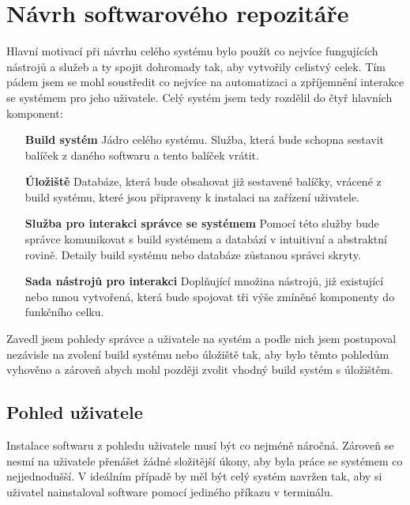 \documentclass[
  digital,     %
  oneside,     %
  nosansbold,  %
  nocolorbold, %
  lof,         %
  lot,         %
]{fithesis4}
\begin{document}
\chapter{Návrh softwarového repozitáře}

Hlavní motivací při návrhu celého systému bylo použít co nejvíce fungujících
nástrojů a služeb a ty spojit dohromady tak, aby vytvořily celistvý celek. Tím pádem
jsem se mohl soustředit co nejvíce na automatizaci a zpříjemnění interakce se systémem
pro jeho uživatele. Celý systém jsem tedy rozdělil do čtyř hlavních komponent:

\begin{itemize}
    \item[\textbf{Build systém}] Jádro celého systému. Služba, která bude 
    schopna sestavit balíček z daného softwaru a tento balíček vrátit.
    \item[\textbf{Úložiště}] Databáze, která bude obsahovat již sestavené balíčky,
    vrácené z build systému, které jsou připraveny k instalaci na zařízení uživatele.
    \item[\textbf{Služba pro interakci správce se systémem}] Pomocí této služby
    bude správce komunikovat s build systémem a databází v intuitivní a abstraktní
    rovině. Detaily build systému nebo databáze zůstanou správci skryty.
    \item[\textbf{Sada nástrojů pro interakci}] Doplňující množina nástrojů, již
    existující nebo mnou vytvořená, která bude spojovat tři výše zmíněné komponenty
    do funkčního celku.
\end{itemize}

Zavedl jsem pohledy správce a uživatele na systém a podle nich jsem postupoval nezávisle
na zvolení build systému nebo úložiště tak, aby bylo těmto pohledům vyhověno a zároveň
abych mohl později zvolit vhodný build systém s úložištěm.


\section{Pohled uživatele}

Instalace softwaru z pohledu uživatele musí být co nejméně náročná. Zároveň
se nesmí na uživatele přenášet žádné složitější úkony, aby byla práce
se systémem co nejjednodušší. V ideálním případě by měl být celý systém
navržen tak, aby si uživatel nainstaloval software pomocí jediného příkazu
v terminálu.
\end{document}
